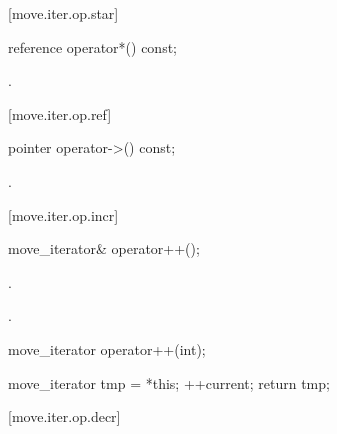 [move.iter.op.star]{}

%
%
\begin{itemdecl}
reference operator*() const;
\end{itemdecl}

\begin{itemdescr}
\pnum
\returns {}.
\end{itemdescr}

[move.iter.op.ref]{}

%
%
\begin{itemdecl}
pointer operator->() const;
\end{itemdecl}

\begin{itemdescr}
\pnum
\returns {}.
\end{itemdescr}

[move.iter.op.incr]{}

%
%
\begin{itemdecl}
move_iterator& operator++();
\end{itemdecl}

\begin{itemdescr}
\pnum
\effects {}.

\pnum
\returns {}.
\end{itemdescr}

%
%
\begin{itemdecl}
move_iterator operator++(int);
\end{itemdecl}

\begin{itemdescr}
\pnum
\effects
\begin{codeblock}
move_iterator tmp = *this;
++current;
return tmp;
\end{codeblock}
\end{itemdescr}

[move.iter.op.decr]{}

